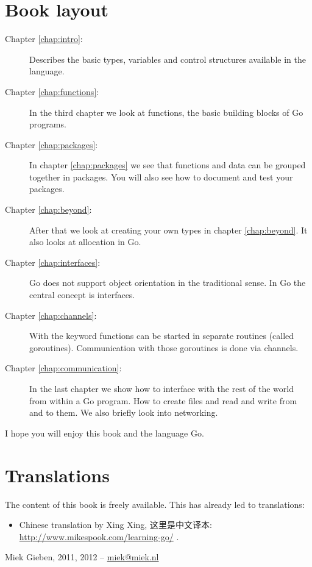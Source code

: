 \section*{Book layout}
\begin{description}
\item[Chapter \ref{chap:intro}: ] 
Describes the basic types, variables and control
structures available in the language.

\item[Chapter \ref{chap:functions}: ] 
In the third chapter we look at functions, the basic building blocks of Go programs.

\item[Chapter \ref{chap:packages}: ] 
In chapter \ref{chap:packages} we see that functions and data can be grouped together
in packages. You will also see how to document and test your packages.

\item[Chapter \ref{chap:beyond}: ] 
After that we look at creating your own types in chapter \ref{chap:beyond}. It also
looks at allocation in Go.

\item[Chapter \ref{chap:interfaces}: ] 
Go does not support object orientation in the traditional sense.
In Go the central concept is interfaces.

\item[Chapter \ref{chap:channels}: ] 
With the  keyword functions can be started in separate routines (called goroutines). 
Communication with those goroutines is done via channels. 

\item[Chapter \ref{chap:communication}: ] 
In the last chapter we show how to interface with the rest of the world from within 
a Go program. How to create files and read and write from and to them. We also briefly
look into networking.
\end{description}

I hope you will enjoy this book and the language Go.

\section*{Translations}
The content of this book is freely available. This has already led to translations:
\begin{itemize}
\item{Chinese translation by Xing Xing, 这里是中文译本:
    {\url{http://www.mikespook.com/learning-go/}} .}
\end{itemize}

\begin{flushright}
Miek Gieben, 2011, 2012 -- \url{miek@miek.nl}
\end{flushright}
